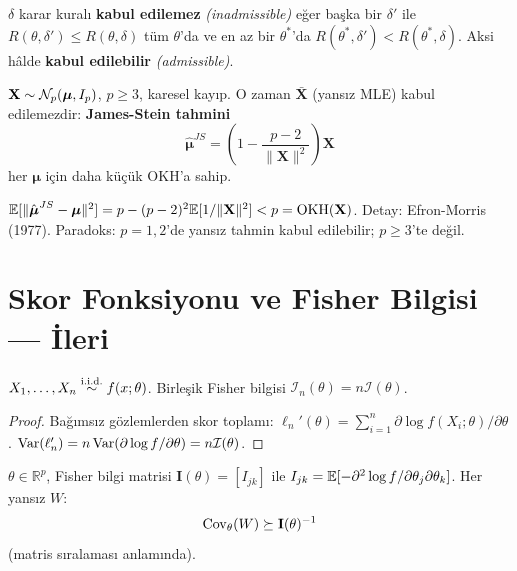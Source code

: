 \begin{tanim}\label{def:kabul_edilemez}
$\delta$ karar kuralı \textbf{kabul edilemez} \emph{(inadmissible)} eğer başka bir $\delta'$ ile $R(\theta,\delta')\leq R(\theta,\delta)$ tüm $\theta$'da ve en az bir $\theta^*$'da $R(\theta^*,\delta')<R(\theta^*,\delta)$. Aksi hâlde \textbf{kabul edilebilir} \emph{(admissible)}.
\end{tanim}

\begin{teorem}\label{thm:stein}
$\mathbf{X}\sim\mathcal{N}_p(\boldsymbol\mu,I_p)$, $p\geq3$, karesel kayıp. O zaman $\bar{\mathbf{X}}$ (yansız MLE) kabul edilemezdir: \textbf{James-Stein tahmini}
\[
  \hat{\boldsymbol\mu}^{JS} = \left(1 - \frac{p-2}{\|\mathbf{X}\|^2}\right)\mathbf{X}
\]
her $\boldsymbol\mu$ için daha küçük OKH'a sahip.
\end{teorem}

\begin{ispatiskele}
$\mathbb{E}[\|\hat{\boldsymbol\mu}^{JS}-\boldsymbol\mu\|^2]=p-(p-2)^2\mathbb{E}[1/\|\mathbf{X}\|^2]<p=\mathrm{OKH}(\mathbf{X})$. Detay: Efron-Morris (1977). Paradoks: $p=1,2$'de yansız tahmin kabul edilebilir; $p\geq3$'te değil.
\end{ispatiskele}

\section{Skor Fonksiyonu ve Fisher Bilgisi --- İleri}
\label{sec:fisher_ileri}

\begin{teorem}\label{thm:fisher_birlesen}
$X_1,\ldots,X_n\overset{\text{i.i.d.}}{\sim} f(x;\theta)$. Birleşik Fisher bilgisi $\mathcal{I}_n(\theta)=n\mathcal{I}(\theta)$.
\end{teorem}

\begin{proof}
Bağımsız gözlemlerden skor toplamı: $\ell_n'(\theta)=\sum_{i=1}^n\partial\log f(X_i;\theta)/\partial\theta$. $\operatorname{Var}(\ell_n')=n\operatorname{Var}(\partial\log f/\partial\theta)=n\mathcal{I}(\theta)$.
\end{proof}

\begin{teorem}\label{thm:cr_cok}
$\theta\in\mathbb{R}^p$, Fisher bilgi matrisi $\mathbf{I}(\theta)=[I_{jk}]$ ile $I_{jk}=\mathbb{E}[-\partial^2\log f/\partial\theta_j\partial\theta_k]$. Her yansız $W$:
\[
  \operatorname{Cov}_\theta(W) \succeq \mathbf{I}(\theta)^{-1}
\]
(matris sıralaması anlamında).
\end{teorem}

